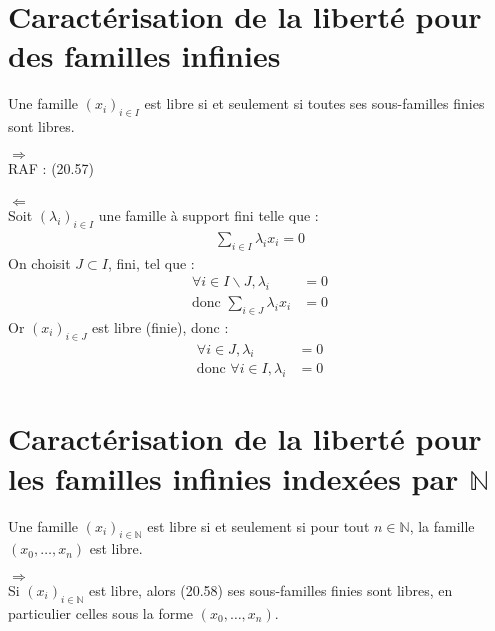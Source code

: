 \documentclass[../main.tex]{subfiles}
\begin{document}
\section{Caractérisation de la liberté pour des familles infinies}
\begin{tcolorbox}[title=Propostion 20.58, title filled=false, colframe=lightblue, colback=lightblue!10!white]
    Une famille $(x_i)_{i\in I}$ est libre si et seulement si toutes ses sous-familles finies sont libres.
\end{tcolorbox}

$\boxed{\Rightarrow}$ \\
RAF : (20.57) \\ \\

$\boxed{\Leftarrow}$ \\
Soit $(\lambda_i)_{i\in I}$ une famille à support fini telle que : \\
\begin{align}
    \sum_{i\in I} \lambda_i x_i = 0
\end{align}
On choisit $J \subset I$, fini, tel que : 
\begin{align*}
    \forall i \in I \backslash J, \lambda_i &= 0 \\
    \text{donc } \sum_{i\in J} \lambda_i x_i &= 0
\end{align*}
Or $(x_i)_{i\in J}$ est libre (finie), donc : 
\begin{align*}
    \forall i \in J, \lambda_i &= 0 \\
    \text{donc } \forall i \in I, \lambda_i &= 0
\end{align*}

\section{Caractérisation de la liberté pour les familles infinies indexées par $\mathbb{N}$}
\begin{tcolorbox}[title=Propostion 20.60, title filled=false, colframe=lightblue, colback=lightblue!10!white]
    Une famille $(x_i)_{i\in \mathbb{N}}$ est libre si et seulement si pour tout $n\in \mathbb{N}$, la famille $(x_0, \ldots, x_n)$ est libre. 
\end{tcolorbox}

$\boxed{\Rightarrow}$ \\
Si $(x_i)_{i\in \mathbb{N}}$ est libre, alors (20.58) ses sous-familles finies sont libres, en particulier celles sous la forme $(x_0, \ldots, x_n)$. \\ \\
\end{document}
